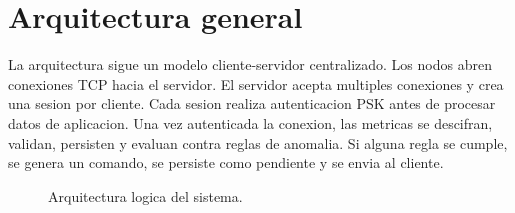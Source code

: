 \documentclass[11pt,letterpaper]{article}
\begin{document}
\newpage
\section{Arquitectura general}

La arquitectura sigue un modelo cliente-servidor centralizado. Los nodos abren
conexiones TCP hacia el servidor. El servidor acepta multiples conexiones y crea
una sesion por cliente. Cada sesion realiza autenticacion PSK antes de procesar
datos de aplicacion. Una vez autenticada la conexion, las metricas se descifran,
validan, persisten y evaluan contra reglas de anomalia. Si alguna regla se
cumple, se genera un comando, se persiste como pendiente y se envia al cliente.

\begin{figure}[H]
\centering
{}
\caption{Arquitectura logica del sistema.}
\end{figure}
\end{document}
